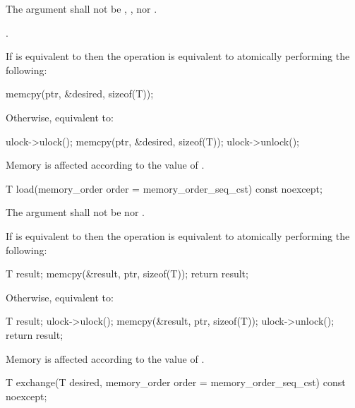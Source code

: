 \begin{itemdescr}
\pnum
\removed{\requires}\added{\expects} The  argument shall not be
,
, nor
.

\pnum
{}.
\begin{addedblock}
\effects If  is equivalent to 
then the operation is equivalent to atomically performing the following:
\begin{codeblock}
  memcpy(ptr, &desired, sizeof(T));
\end{codeblock}
Otherwise, equivalent to:
\begin{codeblock}
  ulock->ulock();
  memcpy(ptr, &desired, sizeof(T));
  ulock->unlock();
\end{codeblock}
\end{addedblock}
Memory is affected according to the value of .
\end{itemdescr}

\begin{itemdecl}
T load(memory_order order = memory_order_seq_cst) const noexcept;
\end{itemdecl}

\begin{itemdescr}
\pnum
\removed{\requires}\added{\expects} The  argument shall not be
 nor .

\begin{addedblock}
\pnum
\effects If  is equivalent to  then the
operation is equivalent to atomically performing the following:
\begin{codeblock}
  T result;
  memcpy(&result, ptr, sizeof(T));
  return result;
\end{codeblock}
Otherwise, equivalent to:
\begin{codeblock}
  T result;
  ulock->ulock();
  memcpy(&result, ptr, sizeof(T));
  ulock->unlock();
  return result;
\end{codeblock}
\end{addedblock}
Memory is affected according to the value of .

\end{itemdescr}

\begin{itemdecl}
T exchange(T desired, memory_order order = memory_order_seq_cst) const noexcept;
\end{itemdecl}

